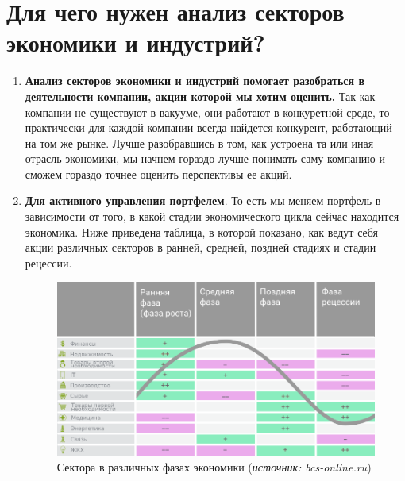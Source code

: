 \documentclass{article}
\begin{document}
	\section{Для чего нужен анализ секторов экономики и индустрий?}
	\begin{enumerate}
		\item \textbf{Анализ секторов экономики и индустрий помогает разобраться в деятельности компании, акции которой мы хотим оценить.} Так как компании не существуют в вакууме, они работают в конкуретной среде, то практически для каждой компании всегда найдется конкурент, работающий на том же рынке. Лучше разобравшись в том, как устроена та или иная отрасль экономики, мы начнем гораздо лучше понимать саму компанию и сможем гораздо точнее оценить перспективы ее акций.
		
		\item \textbf{Для активного управления портфелем}. То есть мы меняем портфель в зависимости от того, в какой стадии экономического цикла сейчас находится экономика. Ниже приведена таблица, в которой показано, как ведут себя акции различных секторов в ранней, средней, поздней стадиях и стадии рецессии.
		\begin{figure}[h]
			\centering
			\includegraphics[scale = 0.47]{sectors_rus.jpg}
			\caption{Сектора в различных фазах экономики (\textit{источник: bcs-online.ru})}
			\label{model}
		\end{figure}
		

\end{enumerate}
\end{document}
